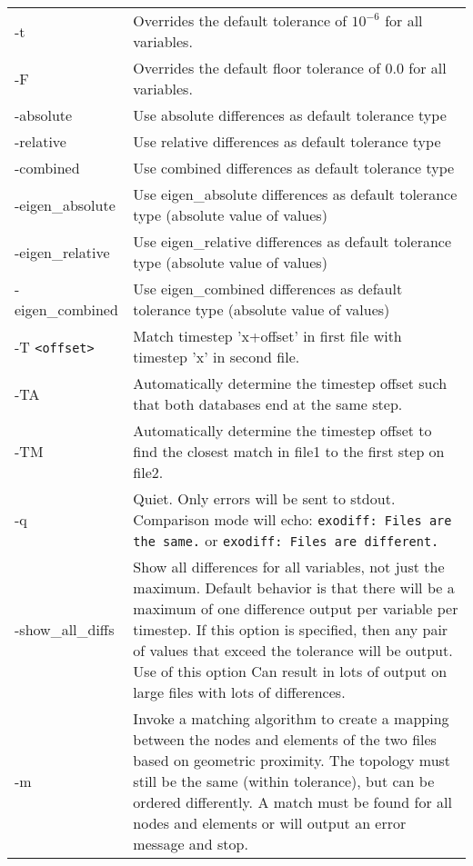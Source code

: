 \renewcommand\arraystretch{1.5}
\begin{longtable}{lp{4.0in}}
-t \tt<real value> & Overrides the default tolerance of $10^{-6}$ for
	all variables.\\
-F \tt<real value> & Overrides the default floor tolerance of 0.0 for
	all variables.\\
-absolute & Use absolute differences as default tolerance type \\
-relative & Use relative differences as default tolerance type \\
-combined & Use combined differences as default tolerance type \\
-eigen\_absolute & Use eigen\_absolute differences as default tolerance type (absolute value of values) \\
-eigen\_relative & Use eigen\_relative differences as default tolerance type (absolute value of values) \\
-eigen\_combined & Use eigen\_combined differences as default tolerance type (absolute value of values) \\

-T \tt<offset> & Match timestep 'x+offset' in first file with timestep
	'x' in second file. \\

-TA   & Automatically determine the timestep offset such that both databases end at the same step. \\
-TM   & Automatically determine the timestep offset to find the closest match in file1 to the first step on file2.\\
-q    & Quiet.  Only errors will be sent to stdout. Comparison mode
	will echo: {\tt exodiff: Files are the same.} or {\tt exodiff: Files are different.}\\

-show\_all\_diffs & Show all differences for all variables, not
	just the maximum.  Default behavior is that there will be a maximum of
	one difference output per variable per timestep.  If this option is
	specified, then any pair of values that exceed the tolerance will be
	output.  Use of this option Can result in lots of output on large files
        with lots of differences.\\

-m & Invoke a matching algorithm to create a mapping between the
	nodes and elements of the two files based on geometric proximity.
	The topology must still be the same (within tolerance), but can be ordered differently.
	A match must be found for all nodes and elements or \exodiff{}
	will output an error message and stop.\\


\end{longtable}
